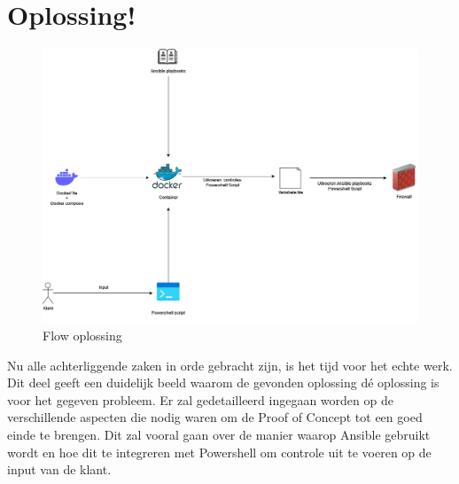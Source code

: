 \newpage
\section{Oplossing!}

\begin{figure}[ht]
    \centering
    \includegraphics[width=150mm]{bachproef/graphics/flow.png}
    \caption{Flow oplossing}
    \label{fig:Flow oplossing}
\end{figure}

Nu alle achterliggende zaken in orde gebracht zijn, is het tijd voor het echte werk. Dit deel geeft een duidelijk beeld waarom de gevonden oplossing dé oplossing is voor het gegeven probleem. Er zal gedetailleerd ingegaan worden op de verschillende aspecten die nodig waren om de Proof of Concept tot een goed einde te brengen. Dit zal vooral gaan over de manier waarop Ansible gebruikt wordt en hoe dit te integreren met Powershell om controle uit te voeren op de input van de klant.

